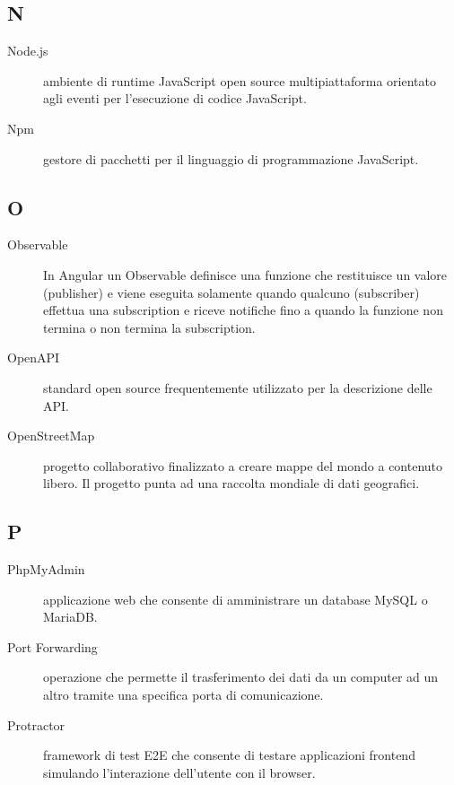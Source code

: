 \documentclass[../manuale-manutentore.tex]{subfiles}
\begin{document}
\subsection{N}

\begin{description}
  \item[Node.js] ambiente di runtime JavaScript open source multipiattaforma orientato agli eventi per l'esecuzione di codice JavaScript.
  \item[Npm] gestore di pacchetti per il linguaggio di programmazione JavaScript.
\end{description}

\subsection{O}

\begin{description}
  \item[Observable] In Angular un Observable definisce una funzione che restituisce un valore (publisher) e viene eseguita solamente quando qualcuno (subscriber) effettua una subscription e riceve notifiche fino a quando la funzione non termina o non termina la subscription.
    \item[OpenAPI] standard open source frequentemente utilizzato per la descrizione delle API\@.
    \item[OpenStreetMap] progetto collaborativo finalizzato a creare mappe del mondo a contenuto libero. Il progetto punta ad una raccolta mondiale di dati geografici.
\end{description}

\subsection{P}

\begin{description}
    \item[PhpMyAdmin] applicazione web che consente di amministrare un database MySQL o MariaDB\@.
    \item[Port Forwarding] operazione che permette il trasferimento dei dati da un computer ad un altro tramite una specifica porta di comunicazione.
    \item[Protractor] framework di test E2E che consente di testare applicazioni frontend simulando l'interazione dell'utente con il browser.
\end{description}
\end{document}
